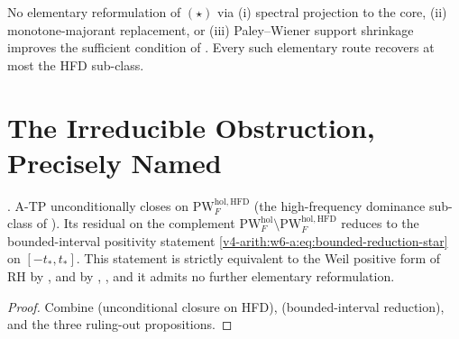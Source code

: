 \begin{remark}
\label{v4-arith:w6-a:rem:three-rule-outs}
No elementary reformulation of \((\star)\) via (i) spectral projection
to the core, (ii) monotone-majorant replacement, or (iii)
Paley--Wiener support shrinkage improves the sufficient condition of
. Every such elementary route
recovers at most the HFD sub-class.
\end{remark}

\section{The Irreducible Obstruction, Precisely Named}
\label{v4-arith:w6-a:irreducible}

\begin{theorem}
\label{v4-arith:w6-a:thm:irreducible-ATP}
\ClaimStatusProvedHere. A-TP unconditionally closes on
\(\mathrm{PW}^{\mathrm{hol},\mathrm{HFD}}_{F}\) (the high-frequency
dominance sub-class of ). Its
residual on the complement
\(\mathrm{PW}^{\mathrm{hol}}_{F}\setminus\mathrm{PW}^{\mathrm{hol},\mathrm{HFD}}_{F}\)
reduces to the bounded-interval positivity statement
\eqref{v4-arith:w6-a:eq:bounded-reduction-star} on
\([-t_{\ast},t_{\ast}]\). This statement is strictly equivalent to
the Weil positive form of RH by
, and by
,
, and
 it admits no
further elementary reformulation.
\end{theorem}

\begin{proof}
Combine  (unconditional closure on
HFD),  (bounded-interval
reduction), and the three ruling-out propositions.
\end{proof}

